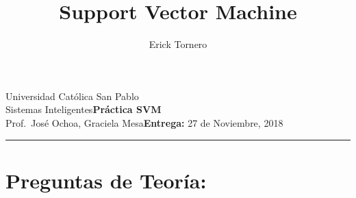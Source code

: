 \documentclass{article}
\title{Support Vector Machine}
\author{Erick Tornero}
\date{}
\newcommand{\assignment}{Práctica SVM}
\newcommand{\duedate}{27 de Noviembre, 2018}
\begin{document}
Universidad Católica San Pablo\hfill\\
Sistemas Inteligentes\hfill\textbf{\assignment}\\
Prof.\ José Ochoa, Graciela Mesa\hfill\textbf{Entrega:} \duedate\\
\smallskip\hrule\bigskip

{\let\newpage\relax\maketitle}

\section{Preguntas de Teoría:}
\end{document}
